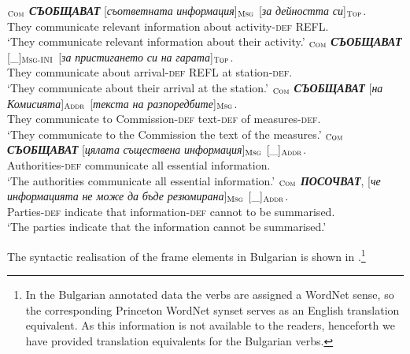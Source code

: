 \documentclass[output=paper,colorlinks,citecolor=brown]{langscibook}
\begin{document}
\begin{exe}
\ex \label{ex:02commbg}
\begin{xlist}
\ex  \label{ex:02commbg:a}
\gll {[\textit{Те}]}$_{\text{\textsc{Com}}}$ \textit{\textbf{СЪОБЩАВАТ}} [\textit{съответната} \textit{информация}]$_{\text{\textsc{Msg}}}$ [\textit{за} \textit{дейността} \textit{си}]$_{\text{\textsc{Top}}}$.\\
They communicate relevant information about activity-\textsc{def} REFL.\\
\glt
`They communicate relevant information about their activity.'
\ex  \label{ex:02commbg:b}
\gll {[\textit{Те}]}$_{\text{\textsc{Com}}}$ \textit{\textbf{СЪОБЩАВАТ}} {[\_]}$_{\text{\textsc{Msg-INI}}}$ [\textit{за} \textit{пристигането} \textit{си} \textit{на} \textit{гарата}]$_{\text{\textsc{Top}}}$.\\
They communicate {} about arrival-\textsc{def} REFL at station-\textsc{def}.\\
\glt `They communicate about their arrival at the station.'
\ex  \label{ex:02commbg:c}
\gll {[\textit{Те}]}$_{\text{\textsc{Com}}}$ \textit{\textbf{СЪОБЩАВАТ}} [\textit{на} \textit{Комисията}]$_{\text{\textsc{Addr}}}$ [\textit{текста} \textit{на} \textit{разпоредбите}]$_{\text{\textsc{Msg}}}$.\\
They communicate to Commission-\textsc{def} text-\textsc{def} of measures-\textsc{def}.\\
\glt `They communicate to the Commission the text of the measures.'
\ex  \label{ex:02commbg:d}
$_{\text{\textsc{Com}}}$ \textit{\textbf{СЪОБЩАВАТ}} [\textit{цялата} \textit{съществена} \textit{информация}]$_{\text{\textsc{Msg}}}$ {[\_]}$_{\text{\textsc{Addr}}}$.\\
Authorities-\textsc{def} communicate all essential information. {}\\
\glt `The authorities communicate all essential information.'
\ex \label{ex:02commbg:e}
$_{\text{\textsc{Com}}}$ \textit{\textbf{ПОСОЧВАТ}},  [\textit{че} \textit{информацията} \textit{не може} \textit{да} \textit{бъде} \textit{резюмирана}]$_{\text{\textsc{Msg}}}$ {[\_]}$_{\text{\textsc{Addr}}}$.\\
Parties-\textsc{def} indicate that information-\textsc{def} cannot to be summarised. {}\\
\glt `The parties indicate that the information cannot be summarised.'
\end{xlist}
\end{exe}

The syntactic realisation of the  frame elements in Bulgarian is shown in .\footnote{In the Bulgarian annotated data the verbs are assigned a WordNet sense, so the corresponding Princeton WordNet synset serves as an English translation equivalent. As this information is not available to the readers, henceforth we have provided translation equivalents for the Bulgarian verbs.}
 
\end{document}
